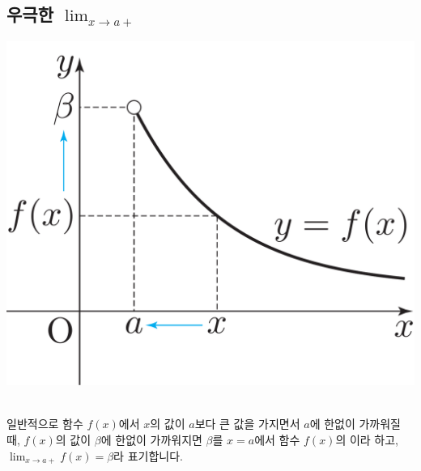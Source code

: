 \subsection{우극한 $\lim_{x \to a+}$}
\begin{center} \includegraphics[scale=\pgfkeysvalueof{picsize}]{DBs/pic/zerr_03.pdf}\
	\end{center}일반적으로 함수 $f\left( x \right) $에서 $x$의 값이 $a$보다 큰 값을 가지면서 $a$에 한없이 가까워질 때, $f\left( x \right) $의 값이 $\beta$에 한없이 가까워지면 $\beta$를 $x=a$에서 함수 $f\left( x \right) $의 이라 하고, $\lim_{x \to a+}f\left( x \right) = \beta$라 표기합니다.
\clearpage
